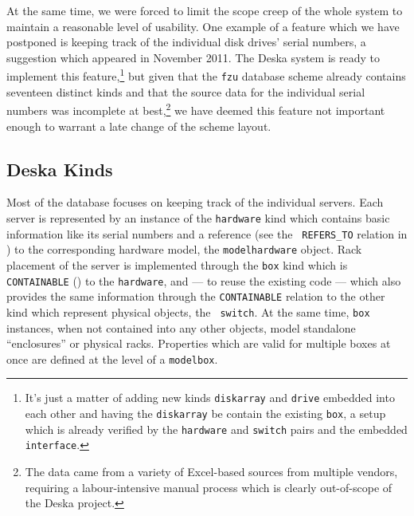 \documentclass[deska]{subfiles}
\begin{document}
At the same time, we were forced to limit the scope creep of the whole system to maintain a reasonable level of
usability.  One example of a feature which we have postponed is keeping track of the individual disk drives' serial
numbers, a suggestion which appeared in November 2011.  The Deska system is ready to implement this
feature,\footnote{It's just a matter of adding new kinds {\tt diskarray} and {\tt drive} embedded into each other and
having the {\tt diskarray} be contain the existing {\tt box}, a setup which is already verified by the {\tt hardware}
and {\tt switch} pairs and the embedded {\tt interface}.} but given that the {\tt fzu} database scheme already contains
seventeen distinct kinds and that the source data for the individual serial numbers was incomplete at best,\footnote{The
data came from a variety of Excel-based sources from multiple vendors, requiring a labour-intensive manual process which
is clearly out-of-scope of the Deska project.} we have deemed this feature not important enough to warrant a late change
of the scheme layout.

\subsection{Deska Kinds}

Most of the database focuses on keeping track of the individual servers.  Each server is represented by an instance of
the {\tt hardware} kind which contains basic information like its serial numbers and a reference (see the {\tt
REFERS\_TO} relation in ) to the corresponding hardware model, the {\tt modelhardware}
object.  Rack placement of the server is implemented through the {\tt box} kind which is {\tt CONTAINABLE}
() to the {\tt hardware}, and --- to reuse the existing code --- which also provides the
same information through the {\tt CONTAINABLE} relation to the other kind which represent physical objects, the {\tt
switch}.  At the same time, {\tt box} instances, when not contained into any other objects, model standalone
``enclosures'' or physical racks.  Properties which are valid for multiple boxes at once are defined at the level of a
{\tt modelbox}.
\end{document}
